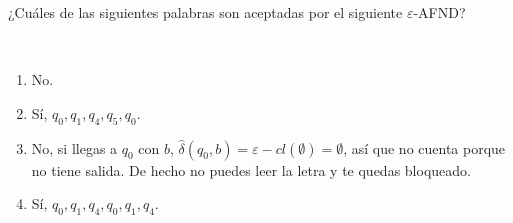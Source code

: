 \documentclass[twoside]{article}
\begin{document}
\newpage

\begin{ejercicio}{3}
¿Cuáles de las siguientes palabras son aceptadas por el siguiente $\varepsilon$-AFND?
\end{ejercicio}
\begin{solucion}\
\begin{enumerate}
\item No.
\item Sí, $q_0,q_1,q_4,q_5,q_0$.
\item No, si llegas a $q_0$ con $b$, $\hat{\delta}(q_0,b)=\varepsilon-cl(\emptyset)=\emptyset$, así que no cuenta porque no tiene salida. De hecho no puedes leer la letra y te quedas bloqueado.
\item Sí, $q_0,q_1,q_4,q_0,q_1,q_4$.
\end{enumerate}
\end{solucion}

\newpage
\end{document}
